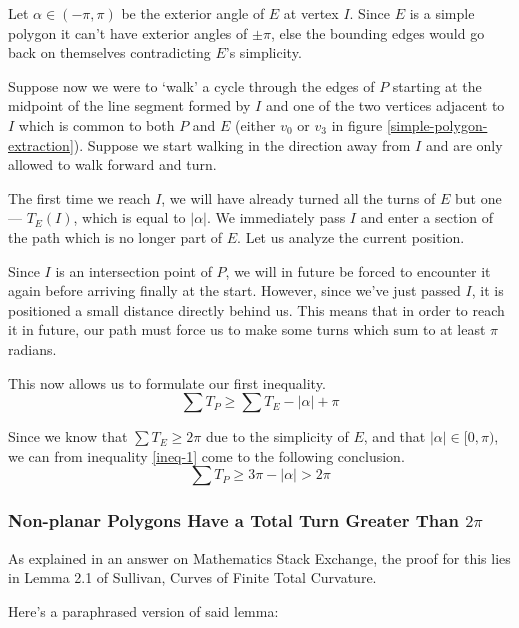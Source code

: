 \documentclass{article}
\begin{document}
Let \(\alpha \in (-\pi, \pi)\) be the exterior angle of \(E\) at vertex \(I\). Since \(E\) is a simple polygon it can't have exterior angles of \(\pm\pi\), else the bounding edges would go back on themselves contradicting \(E\)'s simplicity.

Suppose now we were to `walk' a cycle through the edges of \(P\) starting at the midpoint of the line segment formed by \(I\) and one of the two vertices adjacent to \(I\) which is common to both \(P\) and \(E\) (either \(v_0\) or \(v_3\) in figure \ref{simple-polygon-extraction}). Suppose we start walking in the direction away from \(I\) and are only allowed to walk forward and turn.

The first time we reach \(I\), we will have already turned all the turns of \(E\) but one --- \(T_E(I)\), which is equal to \(|\alpha|\). We immediately pass \(I\) and enter a section of the path which is no longer part of \(E\). Let us analyze the current position.

Since \(I\) is an intersection point of \(P\), we will in future be forced to encounter it again before arriving finally at the start. However, since we've just passed \(I\), it is positioned a small distance directly behind us. This means that in order to reach it in future, our path must force us to make some turns which sum to at least \(\pi\) radians.

This now allows us to formulate our first inequality.
\begin{equation}
	\sum T_P \geq \sum T_E - |\alpha| + \pi \label{ineq-1}
\end{equation}

Since we know that \(\sum T_E \geq 2\pi\) due to the simplicity of \(E\), and that \(|\alpha| \in [0, \pi)\), we can from inequality \ref{ineq-1} come to the following conclusion.
\begin{equation}
	\sum T_P \geq 3\pi - |\alpha| > 2\pi
\end{equation}

\subsubsection{Non-planar Polygons Have a Total Turn Greater Than \(2\pi\)}

As explained in an answer on Mathematics Stack Exchange\autocite{brainjam}, the proof for this lies in Lemma 2.1 of Sullivan, Curves of Finite Total Curvature\autocite{sullivan}.

Here's a paraphrased version of said lemma:
\end{document}

